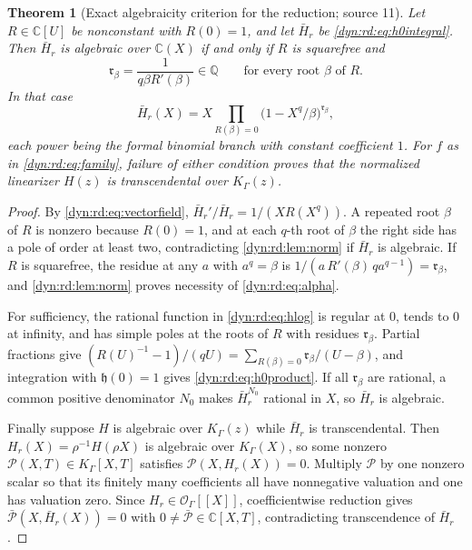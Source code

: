 \documentclass[11pt,letterpaper]{article}
\newtheorem{theorem}{Theorem}[section]
\theoremstyle{definition}
\theoremstyle{remark}
\newcommand{\C}{\mathbb C}
\newcommand{\Q}{\mathbb Q}
\newcommand{\OO}{\mathcal O}
\numberwithin{equation}{section}
\begin{document}
\begin{theorem}[Exact algebraicity criterion for the reduction; source 11]
\label{dyn:rd:thm:algebraicity}
Let $R\in\C[U]$ be nonconstant with $R(0)=1$, and let $\bar H_r$ be
\eqref{dyn:rd:eq:h0integral}. Then $\bar H_r$ is algebraic over $\C(X)$ if
and only if $R$ is squarefree and
\begin{equation}\label{dyn:rd:eq:alpha}
 \mathfrak r_\beta=\frac1{q\beta R'(\beta)}\in\Q
 \qquad\text{for every root }\beta\text{ of }R.
\end{equation}
In that case
\begin{equation}\label{dyn:rd:eq:h0product}
 \bar H_r(X)=X\prod_{R(\beta)=0}\bigl(1-X^{q}/\beta\bigr)^{\mathfrak r_\beta},
\end{equation}
each power being the formal binomial branch with constant coefficient $1$.
For $f$ as in \eqref{dyn:rd:eq:family}, failure of either condition proves
that the normalized linearizer $H(z)$ is transcendental over $K_\Gamma(z)$.
\end{theorem}
\begin{proof}
By \eqref{dyn:rd:eq:vectorfield}, $\bar H_r'/\bar H_r=1/(XR(X^{q}))$. A
repeated root $\beta$ of $R$ is nonzero because $R(0)=1$, and at each
$q$-th root of $\beta$ the right side has a pole of order at least two,
contradicting \cref{dyn:rd:lem:norm} if $\bar H_r$ is algebraic. If $R$ is
squarefree, the residue at any $a$ with $a^{q}=\beta$ is
$1/(a\,R'(\beta)\,qa^{q-1})=\mathfrak r_\beta$, and \cref{dyn:rd:lem:norm}
proves necessity of \eqref{dyn:rd:eq:alpha}.

For sufficiency, the rational function in \eqref{dyn:rd:eq:hlog} is regular
at $0$, tends to $0$ at infinity, and has simple poles at the roots of $R$
with residues $\mathfrak r_\beta$. Partial fractions give
$(R(U)^{-1}-1)/(qU)=\sum_{R(\beta)=0}\mathfrak r_\beta/(U-\beta)$, and
integration with $\mathfrak h(0)=1$ gives \eqref{dyn:rd:eq:h0product}. If
all $\mathfrak r_\beta$ are rational, a common positive denominator $N_0$
makes $\bar H_r^{N_0}$ rational in $X$, so $\bar H_r$ is algebraic.

Finally suppose $H$ is algebraic over $K_\Gamma(z)$ while $\bar H_r$ is
transcendental. Then $H_r(X)=\rho^{-1}H(\rho X)$ is algebraic over
$K_\Gamma(X)$, so some nonzero $\mathcal P(X,T)\in K_\Gamma[X,T]$ satisfies
$\mathcal P(X,H_r(X))=0$. Multiply $\mathcal P$ by one nonzero scalar so
that its finitely many coefficients all have nonnegative valuation and one
has valuation zero. Since $H_r\in\OO_\Gamma[[X]]$, coefficientwise reduction
gives $\bar{\mathcal P}(X,\bar H_r(X))=0$ with
$0\ne\bar{\mathcal P}\in\C[X,T]$, contradicting transcendence of
$\bar H_r$.
\end{proof}
\end{document}
